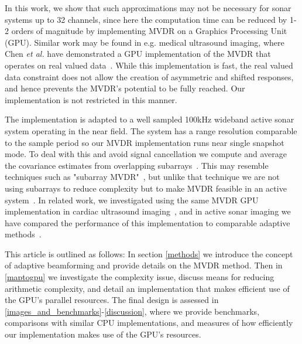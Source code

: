 \documentclass[12pt,journal,draftclsnofoot,onecolumn]{IEEEtran}
\newcommand\1{\vec 1}
\begin{document}
% 
% 


In this work, we show that such approximations may not be necessary for sonar systems up to 32 channels, since here the computation time can be reduced by 1-2 orders of magnitude by implementing MVDR on a Graphics Processing Unit (GPU). Similar work may be found in e.g. medical ultrasound imaging, where Chen \emph{et al.} have demonstrated a GPU implementation of the MVDR that operates on real valued data~\cite{Chen2011,Chen2011a}. While this implementation is fast, the real valued data constraint does not allow the creation of asymmetric and shifted responses, and hence prevents the MVDR's potential to be fully reached. Our implementation is not restricted in this manner.

The implementation is adapted to a well sampled 100\;kHz wideband active sonar system operating in the near field. The system has a range resolution comparable to the sample period so our MVDR implementation runs near single snapshot mode. To deal with this and avoid signal cancellation we compute and average the covariance estimates from overlapping subarrays~\cite{Kailath1985}. This may resemble techniques such as "subarray MVDR"~\cite{Chapman1976}, but unlike that technique we are not using subarrays to reduce complexity but to make MVDR feasible in an active system~\cite{Synnevag2007,Synnevag2009a}. In related work, we investigated using the same MVDR GPU implementation in cardiac ultrasound imaging~\cite{Asen2012,Asen2013}, and in active sonar imaging we have compared the performance of this implementation to comparable adaptive methods~\cite{Buskenes2013}.

This article is outlined as follows: In section \ref{methods} we introduce the concept of adaptive beamforming and provide details on the MVDR method. Then in \ref{maptogpu} we investigate the complexity issue, discuss means for reducing arithmetic complexity, and detail an implementation that makes efficient use of the GPU's parallel resources. The final design is assessed in \ref{images_and_benchmarks}-\ref{discussion}, where we provide benchmarks, comparisons with similar CPU implementations, and measures of how efficiently our implementation makes use of the GPU's resources.
\end{document}
